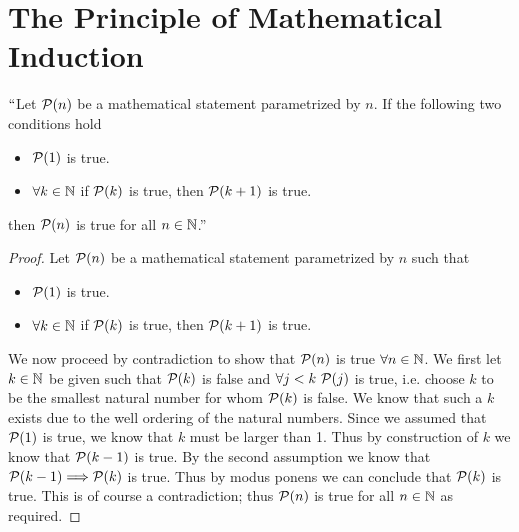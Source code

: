     \section[Mathematical Induction]{The Principle of Mathematical Induction}
        \begin{theorem}
            $``$Let $\mathcal{P}(n)$ be a mathematical statement parametrized by $n$.
            If the following two conditions hold
            \begin{itemize}
                \item
                    $\mathcal{P}(1)$ is true.
                \item
                    $\forall k \in \mathbb{N}$ if $\mathcal{P}(k)$ is true, then $\mathcal{P}(k + 1)$ is true.
            \end{itemize}
            then $\mathcal{P}(n)$ is true for all $n \in \mathbb{N}$.''
        \end{theorem}
        \begin{proof}
            Let $\mathcal{P}(n)$ be a mathematical statement parametrized by $n$ such that
            \begin{itemize}
                \item
                    $\mathcal{P}(1)$ is true.
                \item
                    $\forall k \in \mathbb{N}$ if $\mathcal{P}(k)$ is true, then $\mathcal{P}(k + 1)$ is true.
            \end{itemize}
            We now proceed by contradiction to show that   
            $\mathcal{P}(n)$ is true $\forall n \in \mathbb{N}$. We first let $k \in \mathbb{N}$ be
            given such that $\mathcal{P}(k)$ is false and $\forall j < k \
            \mathcal{P}(j)$ is true, i.e. choose $k$ to be the smallest natural number for whom
            $\mathcal{P}(k)$ is false. We know that such a $k$ exists due to the well ordering
            of the natural numbers. Since we assumed that $\mathcal{P}(1)$ is true, we know that
            $k$ must be larger than 1. Thus by construction of $k$ we know that $\mathcal{P}(k - 1)$
            is true. By the second assumption we know that $\mathcal{P}(k - 1) \Longrightarrow \mathcal{P}(k)$
            is true. Thus by modus ponens we can conclude that $\mathcal{P}(k)$ is true. 
            This is of course a contradiction; thus $\mathcal{P}(n)$ is true for all $n \in \mathbb{N}$
            as required. \QED
        \end{proof}
